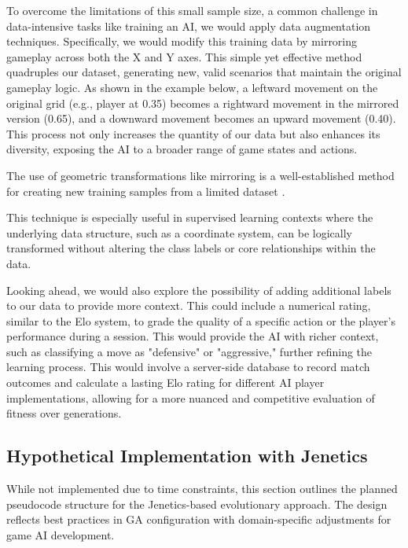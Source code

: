 \documentclass[sigconf]{acmart} %
\begin{document}
To overcome the limitations of this small sample size, a common challenge in data-intensive tasks like training an AI, we would apply data augmentation techniques. Specifically, we would modify this training data by mirroring gameplay across both the X and Y axes. This simple yet effective method quadruples our dataset, generating new, valid scenarios that maintain the original gameplay logic. As shown in the example below, a leftward movement on the original grid (e.g., player at 0.35) becomes a rightward movement in the mirrored version (0.65), and a downward movement becomes an upward movement (0.40). This process not only increases the quantity of our data but also enhances its diversity, exposing the AI to a broader range of game states and actions.

The use of geometric transformations like mirroring is a well-established method for creating new training samples from a limited dataset \cite{perez2017effectiveness}. 

This technique is especially useful in supervised learning contexts where the underlying data structure, such as a coordinate system, can be logically transformed without altering the class labels or core relationships within the data.

Looking ahead, we would also explore the possibility of adding additional labels to our data to provide more context. This could include a numerical rating, similar to the Elo system, to grade the quality of a specific action or the player's performance during a session. This would provide the AI with richer context, such as classifying a move as "defensive" or "aggressive," further refining the learning process. This would involve a server-side database to record match outcomes and calculate a lasting Elo rating for different AI player implementations, allowing for a more nuanced and competitive evaluation of fitness over generations.

\subsection{Hypothetical Implementation with Jenetics}
\label{subsec:hypothetical_jenetics}

While not implemented due to time constraints, this section outlines the planned pseudocode structure for the Jenetics-based evolutionary approach. The design reflects best practices in GA configuration with domain-specific adjustments for game AI development.

\label{subsec:hypothetical_jenetics}
\end{document}
